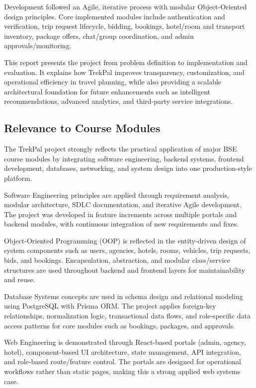 \documentclass[12pt,a4paper]{article}
\newlength{\ThesisParagraphIndent}
\newcommand{\ThesisParagraph}[1]{%
  \par\begingroup
  \setlength{\leftskip}{\ThesisParagraphIndent}%
  \setlength{\parindent}{0pt}%
  \noindent#1\par
  \endgroup}
\begin{document}
\ThesisParagraph{Development followed an Agile, iterative process with modular Object-Oriented design principles. Core implemented modules include authentication and verification, trip request lifecycle, bidding, bookings, hotel/room and transport inventory, package offers, chat/group coordination, and admin approvals/monitoring.}


\ThesisParagraph{This report presents the project from problem definition to implementation and evaluation. It explains how TrekPal improves transparency, customization, and operational efficiency in travel planning, while also providing a scalable architectural foundation for future enhancements such as intelligent recommendations, advanced analytics, and third-party service integrations.}


\subsection{Relevance to Course Modules}

\ThesisParagraph{The TrekPal project strongly reflects the practical application of major BSE course modules by integrating software engineering, backend systems, frontend development, databases, networking, and system design into one production-style platform.}


\ThesisParagraph{Software Engineering principles are applied through requirement analysis, modular architecture, SDLC documentation, and iterative Agile development. The project was developed in feature increments across multiple portals and backend modules, with continuous integration of new requirements and fixes.}


\ThesisParagraph{Object-Oriented Programming (OOP) is reflected in the entity-driven design of system components such as users, agencies, hotels, rooms, vehicles, trip requests, bids, and bookings. Encapsulation, abstraction, and modular class/service structures are used throughout backend and frontend layers for maintainability and reuse.}


\ThesisParagraph{Database Systems concepts are used in schema design and relational modeling using PostgreSQL with Prisma ORM. The project applies foreign-key relationships, normalization logic, transactional data flows, and role-specific data access patterns for core modules such as bookings, packages, and approvals.}


\ThesisParagraph{Web Engineering is demonstrated through React-based portals (admin, agency, hotel), component-based UI architecture, state management, API integration, and role-based route/feature control. The portals are designed for operational workflows rather than static pages, making this a strong applied web systems case.}
\end{document}
